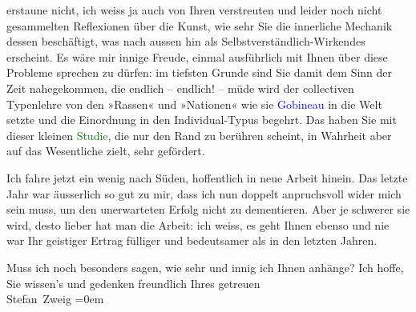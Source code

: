                erstaune nicht, ich weiss ja auch von Ihren verstreuten und leider noch nicht
               gesammelten Reflexionen über die Kunst, wie sehr Sie die innerliche Mechanik dessen
               beschäftigt, was nach aussen hin als Selbstverständlich-Wirkendes erscheint. Es wäre
               mir innige Freude, einmal ausführlich mit Ihnen über diese Probleme sprechen zu
               dürfen: im tiefsten Grunde sind Sie damit dem Sinn der Zeit nahegekommen, die endlich
               – endlich! – müde wird der collectiven Typenlehre von den »Rassen« und »Nationen« wie
               sie \textcolor{blue}{Gobineau}{}\ledrightnote{\textcolor{blue}{Joseph Arthur de Gobineau}} in die Welt setzte und die  Einordnung in den \introOben{}Individual-\introOben{}Typus begehrt. Das haben Sie mit {\pb}dieser kleinen \textcolor{green}{Studie}{}\ledrightnote{\textcolor{green}{Der Geist im Wort und der Geist in der Tat}}, die nur den Rand zu berühren scheint, in Wahrheit
               aber auf das Wesentliche zielt, sehr gefördert.\pend
           
\pstart
           Ich fahre jetzt ein wenig nach Süden, hoffentlich in neue Arbeit hinein. Das letzte
               Jahr war äusserlich so gut zu mir, dass ich nun doppelt anpruchsvoll wider mich sein
               muss, um den unerwarteten Erfolg nicht zu dementieren. Aber je schwerer sie wird,
               desto lieber hat man die Arbeit: ich weiss, es geht Ihnen ebenso und nie war Ihr
               geistiger Ertrag fülliger und bedeutsamer als in den letzten Jahren.\pend
           
\pstart
           Muss ich noch besonders sagen, wie sehr und innig ich Ihnen anhänge? Ich hoffe,
               Sie wissen’s und gedenken freundlich Ihres getreuen{\\[\baselineskip]}\spacefill\mbox{Stefan Zweig}\pend
           \leftskip=0em{}\endnumbering{}
\begin{anhang}
\end{anhang}
      